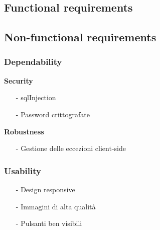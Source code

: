 \documentclass[12pt, a4paper, oneside]{book}
\begin{document}
    \subsection*{Functional requirements}

    \subsection*{Non-functional requirements }
        \subsubsection*{Dependability}
            \textbf{Security}
                \begin{itemize}
                    \item [-] sqlInjection
                    \item [-] Password crittografate
                \end{itemize}
            \textbf{Robustness}
                \begin{itemize}
                    \item [-] Gestione delle eccezioni client-side
                \end{itemize}

        \subsubsection*{Usability}
            \begin{itemize}
                \item [-] Design responsive
                \item [-] Immagini di alta qualità
                \item [-] Pulsanti ben visibili
            \end{itemize}
\end{document}
